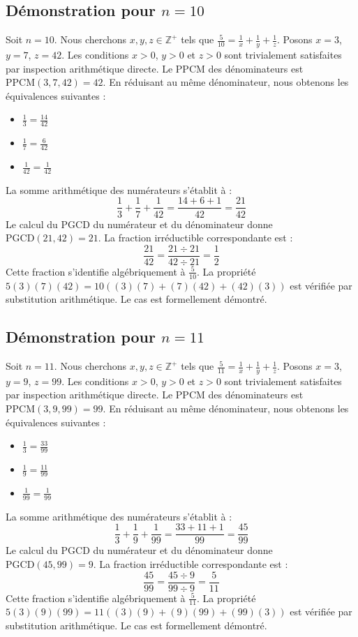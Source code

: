\documentclass[12pt,a4paper]{article}
\begin{document}
\subsection{Démonstration pour $n = 10$}
Soit $n = 10$. Nous cherchons $x, y, z \in \mathbb{Z}^{+}$ tels que $\frac{5}{10} = \frac{1}{x} + \frac{1}{y} + \frac{1}{z}$.
Posons $x = 3$, $y = 7$, $z = 42$.
Les conditions $x > 0$, $y > 0$ et $z > 0$ sont trivialement satisfaites par inspection arithmétique directe.
Le PPCM des dénominateurs est $\text{PPCM}(3, 7, 42) = 42$.
En réduisant au même dénominateur, nous obtenons les équivalences suivantes :
\begin{itemize}
    \item $\frac{1}{3} = \frac{14}{42}$
    \item $\frac{1}{7} = \frac{6}{42}$
    \item $\frac{1}{42} = \frac{1}{42}$
\end{itemize}
La somme arithmétique des numérateurs s'établit à :
$$ \frac{1}{3} + \frac{1}{7} + \frac{1}{42} = \frac{14 + 6 + 1}{42} = \frac{21}{42} $$
Le calcul du PGCD du numérateur et du dénominateur donne $\text{PGCD}(21, 42) = 21$.
La fraction irréductible correspondante est :
$$ \frac{21}{42} = \frac{21 \div 21}{42 \div 21} = \frac{1}{2} $$
Cette fraction s'identifie algébriquement à $\frac{5}{10}$.
La propriété $5(3)(7)(42) = 10((3)(7) + (7)(42) + (42)(3))$ est vérifiée par substitution arithmétique.
Le cas est formellement démontré.

\subsection{Démonstration pour $n = 11$}
Soit $n = 11$. Nous cherchons $x, y, z \in \mathbb{Z}^{+}$ tels que $\frac{5}{11} = \frac{1}{x} + \frac{1}{y} + \frac{1}{z}$.
Posons $x = 3$, $y = 9$, $z = 99$.
Les conditions $x > 0$, $y > 0$ et $z > 0$ sont trivialement satisfaites par inspection arithmétique directe.
Le PPCM des dénominateurs est $\text{PPCM}(3, 9, 99) = 99$.
En réduisant au même dénominateur, nous obtenons les équivalences suivantes :
\begin{itemize}
    \item $\frac{1}{3} = \frac{33}{99}$
    \item $\frac{1}{9} = \frac{11}{99}$
    \item $\frac{1}{99} = \frac{1}{99}$
\end{itemize}
La somme arithmétique des numérateurs s'établit à :
$$ \frac{1}{3} + \frac{1}{9} + \frac{1}{99} = \frac{33 + 11 + 1}{99} = \frac{45}{99} $$
Le calcul du PGCD du numérateur et du dénominateur donne $\text{PGCD}(45, 99) = 9$.
La fraction irréductible correspondante est :
$$ \frac{45}{99} = \frac{45 \div 9}{99 \div 9} = \frac{5}{11} $$
Cette fraction s'identifie algébriquement à $\frac{5}{11}$.
La propriété $5(3)(9)(99) = 11((3)(9) + (9)(99) + (99)(3))$ est vérifiée par substitution arithmétique.
Le cas est formellement démontré.
\end{document}
